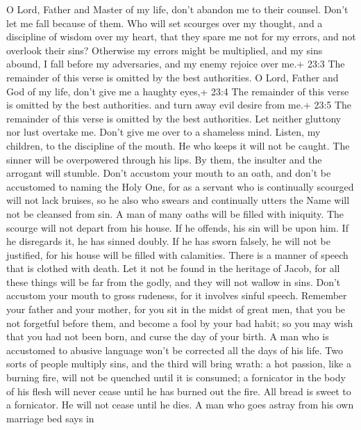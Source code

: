  O Lord, Father and Master of my life, don't abandon me to
their counsel. Don't let me fall because of them.  Who will
set scourges over my thought, and a discipline of wisdom over my heart,
that they spare me not for my errors, and not overlook their sins?
 Otherwise my errors might be multiplied, and my sins
abound, I fall before my adversaries, and my enemy rejoice over me.+
23:3 The remainder of this verse is omitted by the best authorities.
 O Lord, Father and God of my life, don't give me a haughty
eyes,+ 23:4 The remainder of this verse is omitted by the best
authorities.  and turn away evil desire from me.+ 23:5 The
remainder of this verse is omitted by the best authorities. 
Let neither gluttony nor lust overtake me. Don't give me over to a
shameless mind.  Listen, my children, to the discipline of
the mouth. He who keeps it will not be caught.  The sinner
will be overpowered through his lips. By them, the insulter and the
arrogant will stumble.  Don't accustom your mouth to an
oath, and don't be accustomed to naming the Holy One,  for
as a servant who is continually scourged will not lack bruises, so he
also who swears and continually utters the Name will not be cleansed
from sin.  A man of many oaths will be filled with
iniquity. The scourge will not depart from his house. If he offends, his
sin will be upon him. If he disregards it, he has sinned doubly. If he
has sworn falsely, he will not be justified, for his house will be
filled with calamities.  There is a manner of speech that
is clothed with death. Let it not be found in the heritage of Jacob, for
all these things will be far from the godly, and they will not wallow in
sins.  Don't accustom your mouth to gross rudeness, for it
involves sinful speech.  Remember your father and your
mother, for you sit in the midst of great men, that you be not forgetful
before them, and become a fool by your bad habit; so you may wish that
you had not been born, and curse the day of your birth.  A
man who is accustomed to abusive language won't be corrected all the
days of his life.  Two sorts of people multiply sins, and
the third will bring wrath: a hot passion, like a burning fire, will not
be quenched until it is consumed; a fornicator in the body of his flesh
will never cease until he has burned out the fire.  All
bread is sweet to a fornicator. He will not cease until he dies.
 A man who goes astray from his own marriage bed says in
